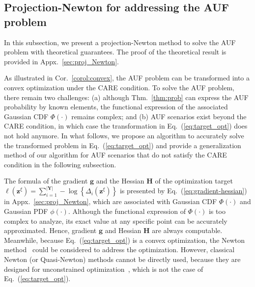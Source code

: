 \documentclass{article}
\theoremstyle{plain}
\theoremstyle{definition}
\def \H {\mathbf{H}}
\def \Y{\mathbf{Y}}
\def \Eq {Eq.}
\def \thm {Thm.}
\def \Y {\mathbf{Y}}
\def \g {\mathbf{g}}
\def \H {\mathbf{H}}
\def \g {\mathbf{g}}
\def \H {\mathbf{H}}
\def \z {\mathbf{z}}
\begin{document}
\subsection{Projection-Newton for addressing the AUF problem}
\label{sec:algorithm}
In this subsection, we present a projection-Newton method to solve the AUF problem with theoretical guarantees. 
The proof of the theoretical result is provided in Appx.~\ref{sec:proj_Newton}.

As illustrated in Cor.~\ref{corol:convex}, the AUF problem can be transformed into a convex optimization under the CARE condition. 
To solve the AUF problem, there remain two challenges:
(a) although \thm~\ref{thm:prob} can express the AUF probability by known elements, the functional expression of the associated Gaussian CDF $\Phi(\cdot)$ remains complex; 
and (b) AUF scenarios exist beyond the CARE condition, in which case the transformation in \Eq~(\ref{eq:target_opt}) does not hold anymore. 
In what follows, we propose an algorithm to accurately solve the transformed problem in \Eq~(\ref{eq:target_opt}) and provide a generalization method of our algorithm for AUF scenarios that do not satisfy the CARE condition in the following subsection. 


The formula of the gradient $\g$ and the Hessian $\H$ of the optimization target $\ell(\z^\xi)=\sum_{i=1}^{|\Y|}-\log\left\{\Delta_i(\z^\xi)\right\}$ is presented by \Eq~(\ref{eq:gradient-hessian}) in Appx.~\ref{sec:proj_Newton}, which are associated with Gaussian CDF $\Phi(\cdot)$ and Gaussian PDF $\phi(\cdot)$. 
Although the functional expression of $\Phi(\cdot)$ is too complex to analyze, its exact value at any specific point can be accurately approximated. 
Hence,  gradient $\g$ and Hessian $\H$ are always computable. 
Meanwhile, because \Eq~(\ref{eq:target_opt}) is a convex optimization, the Newton method~\citep{boyd2004convex} could be considered to address the optimization. 
However, classical Newton (or Quasi-Newton) methods cannot be directly used, because they are designed for unconstrained optimization~\citep{shanno1970conditioning}, which is not the case of \Eq~(\ref{eq:target_opt}).
\end{document}
